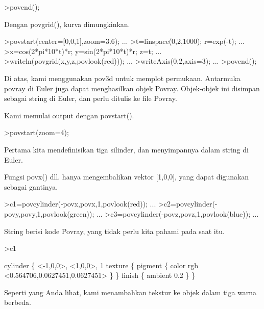 \documentclass[a4paper,10pt]{article}
\begin{document}
\begin{eulernotebook}
\begin{eulerprompt}
>povend();
\end{eulerprompt}
\begin{eulercomment}
Dengan povgrid(), kurva dimungkinkan.
\end{eulercomment}
\begin{eulerprompt}
>povstart(center=[0,0,1],zoom=3.6); ...
>t=linspace(0,2,1000); r=exp(-t); ...
>x=cos(2*pi*10*t)*r; y=sin(2*pi*10*t)*r; z=t; ...
>writeln(povgrid(x,y,z,povlook(red))); ...
>writeAxis(0,2,axis=3); ...
>povend();
\end{eulerprompt}
\begin{eulercomment}
Di atas, kami menggunakan pov3d untuk memplot permukaan. Antarmuka
povray di Euler juga dapat menghasilkan objek Povray. Objek-objek ini
disimpan sebagai string di Euler, dan perlu ditulis ke file Povray.

Kami memulai output dengan povstart().
\end{eulercomment}
\begin{eulerprompt}
>povstart(zoom=4);
\end{eulerprompt}
\begin{eulercomment}
Pertama kita mendefinisikan tiga silinder, dan menyimpannya dalam
string di Euler.

Fungsi povx() dll. hanya mengembalikan vektor [1,0,0], yang dapat
digunakan sebagai gantinya.
\end{eulercomment}
\begin{eulerprompt}
>c1=povcylinder(-povx,povx,1,povlook(red)); ...
>c2=povcylinder(-povy,povy,1,povlook(green)); ...
>c3=povcylinder(-povz,povz,1,povlook(blue)); ...
\end{eulerprompt}
\begin{eulercomment}
String berisi kode Povray, yang tidak perlu kita pahami pada saat itu.
\end{eulercomment}
\begin{eulerprompt}
>c1
\end{eulerprompt}
\begin{euleroutput}
  cylinder \{ <-1,0,0>, <1,0,0>, 1
   texture \{ pigment \{ color rgb <0.564706,0.0627451,0.0627451> \}  \} 
   finish \{ ambient 0.2 \} 
   \}
\end{euleroutput}
\begin{eulercomment}
Seperti yang Anda lihat, kami menambahkan tekstur ke objek dalam tiga
warna berbeda.


\end{eulercomment}
\end{eulernotebook}
\end{document}
